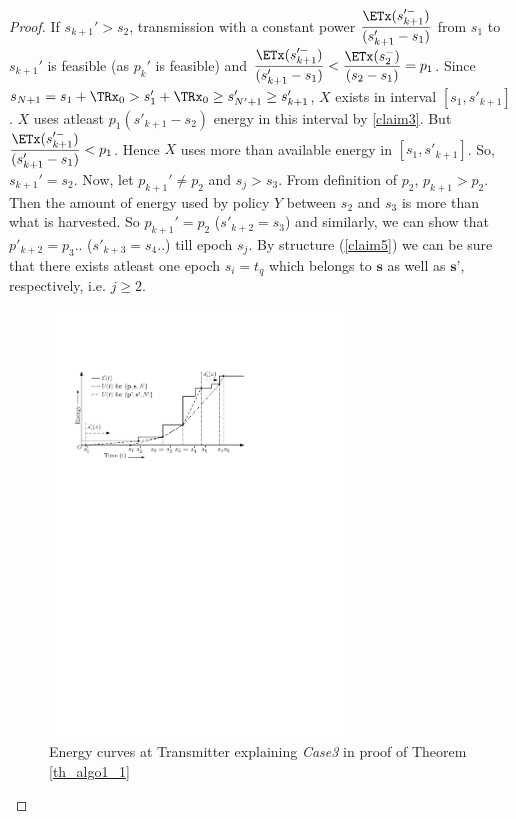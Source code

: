 \begin{proof}
If $s_{k+1}'>s_2$, transmission with a constant power $\dfrac{\ETx(s_{k+1}'^-)}{(s_{k+1}'-s_1)} $ from $s_1$ to $s_{k+1}'$ is feasible (as $p_k'$ is feasible) and $\dfrac{\ETx(s_{k+1}'^-)}{(s_{k+1}'-s_1)}<\dfrac{\ETx(s_2^-)}{(s_2-s_1)}=p_1$. 
Since $s_{N+1}=s_1+\TRx_0>s_1'+\TRx_0\ge s'_{N'+1}\ge s'_{k+1}$, $X$ exists in interval $[s_1,s'_{k+1}]$. $X$ uses atleast $p_1(s'_{k+1}-s_2)$ energy in this interval by \eqref{claim3}. But $\dfrac{\ETx(s_{k+1}'^-)}{(s_{k+1}'-s_1)}<p_1$. Hence $X$ uses more than available energy in $[s_1,s'_{k+1}]$. So, $s_{k+1}'=s_2$. Now, let $p_{k+1}'\neq p_2$ and $s_j>s_3$. From definition of $p_2$, $p_{k+1}>p_2$. Then the amount of energy used by policy $Y$ between $s_2$ and $s_3$ is more than what is harvested. So $p_{k+1}'=p_2$ ($s'_{k+2}=s_3$) and similarly, we can show that $p'_{k+2}=p_3$.. ($ s'_{k+3}=s_4$..) till epoch $s_j$. By structure (\ref{claim5}) we can be sure that there exists atleast one epoch $s_i=t_q$ which belongs to $\textbf{s}$ as well as $\textbf{s'}$, respectively, i.e. $j\ge 2$.

\begin{figure}[htb]
\centering
\centerline{\includegraphics[width=8cm]{Theorem1_sufficient.pdf}}
\caption{Energy curves at Transmitter explaining \textit{Case3} in proof of Theorem \ref{th_algo1_1}}
\label{Theorem1_figure}
\end{figure}


\end{proof}
